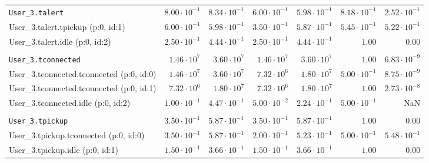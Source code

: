 \begin{table}[htbp]
{\begin{tabular}{lrrrrrr}
\\[-8pt]\texttt{User\_3.talert}                       & $8.00 \cdot 10^{-1}$ & $8.34 \cdot 10^{-1}$ & $6.00 \cdot 10^{-1}$ & $5.98 \cdot 10^{-1}$ & $8.18 \cdot 10^{-1}$ & $2.52 \cdot 10^{-1}$ \\
\hspace{3mm}User\_3.talert.tpickup (p:0, id:1)        & $6.00 \cdot 10^{-1}$ & $5.98 \cdot 10^{-1}$ & $3.50 \cdot 10^{-1}$ & $5.87 \cdot 10^{-1}$ & $5.45 \cdot 10^{-1}$ & $5.22 \cdot 10^{-1}$ \\
\hspace{3mm}User\_3.talert.idle (p:0, id:2)           & $2.50 \cdot 10^{-1}$ & $4.44 \cdot 10^{-1}$ & $2.50 \cdot 10^{-1}$ & $4.44 \cdot 10^{-1}$ &               $1.00$ &               $0.00$ \\
\\[-8pt]\texttt{User\_3.tconnected}                   &  $1.46 \cdot 10^{7}$ &  $3.60 \cdot 10^{7}$ &  $1.46 \cdot 10^{7}$ &  $3.60 \cdot 10^{7}$ &               $1.00$ & $6.83 \cdot 10^{-9}$ \\
\hspace{3mm}User\_3.tconnected.tconnected (p:0, id:0) &  $1.46 \cdot 10^{7}$ &  $3.60 \cdot 10^{7}$ &  $7.32 \cdot 10^{6}$ &  $1.80 \cdot 10^{7}$ & $5.00 \cdot 10^{-1}$ & $8.75 \cdot 10^{-9}$ \\
\hspace{3mm}User\_3.tconnected.tconnected (p:0, id:1) &  $7.32 \cdot 10^{6}$ &  $1.80 \cdot 10^{7}$ &  $7.32 \cdot 10^{6}$ &  $1.80 \cdot 10^{7}$ &               $1.00$ & $2.73 \cdot 10^{-8}$ \\
\hspace{3mm}User\_3.tconnected.idle (p:0, id:2)       & $1.00 \cdot 10^{-1}$ & $4.47 \cdot 10^{-1}$ & $5.00 \cdot 10^{-2}$ & $2.24 \cdot 10^{-1}$ & $5.00 \cdot 10^{-1}$ &                  NaN \\
\\[-8pt]\texttt{User\_3.tpickup}                      & $3.50 \cdot 10^{-1}$ & $5.87 \cdot 10^{-1}$ & $3.50 \cdot 10^{-1}$ & $5.87 \cdot 10^{-1}$ &               $1.00$ &               $0.00$ \\
\hspace{3mm}User\_3.tpickup.tconnected (p:0, id:0)    & $3.50 \cdot 10^{-1}$ & $5.87 \cdot 10^{-1}$ & $2.00 \cdot 10^{-1}$ & $5.23 \cdot 10^{-1}$ & $5.00 \cdot 10^{-1}$ & $5.48 \cdot 10^{-1}$ \\
\hspace{3mm}User\_3.tpickup.idle (p:0, id:1)          & $1.50 \cdot 10^{-1}$ & $3.66 \cdot 10^{-1}$ & $1.50 \cdot 10^{-1}$ & $3.66 \cdot 10^{-1}$ &               $1.00$ &               $0.00$ \\

\end{tabular}}
\end{table}

